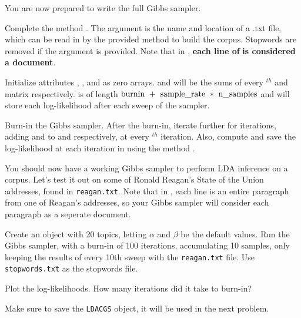 You are now prepared to write the full Gibbs sampler.

\begin{problem}
Complete the method .
The argument  is the name and location of a .txt file, which can be read in by the provided method  to build the corpus.
Stopwords are removed if the  argument is provided.
Note that in , \textbf{each line of}  \textbf{is considered a document}.

Initialize attributes , , and  as zero arrays.
 and  will be the sums of every $^{th}$  and  matrix respectively.
 is of length $\text{\li{burnin} } + \text{ \li{sample\_rate} } * \text{ \li{n\_samples}}$ and will store each log-likelihood after each sweep of the sampler.

Burn-in the Gibbs sampler.
After the burn-in, iterate further for  iterations, adding  and  to  and  respectively, at every $^{th}$ iteration.
Also, compute and save the log-likelihood at each iteration in  using the method .
\end{problem}

You should now have a working Gibbs sampler to perform LDA inference on a corpus.
Let's test it out on some of Ronald Reagan's State of the Union addresses, found in \texttt{reagan.txt}.
Note that in , each line is an entire paragraph from one of Reagan's addresses, so your Gibbs sampler will consider each paragraph as a seperate document.

\begin{problem}

Create an  object with 20 topics, letting $\alpha$ and $\beta$ be the default values.
Run the Gibbs sampler, with a burn-in of 100 iterations, accumulating 10 samples, only keeping the results of every 10th sweep with the \texttt{reagan.txt} file.
Use \texttt{stopwords.txt} as the stopwords file.

\noindent Plot the log-likelihoods.
How many iterations did it take to burn-in?

Make sure to save the \texttt{LDACGS} object, it will be used in the next problem.
\end{problem}

